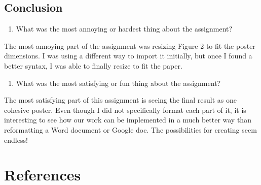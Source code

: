 \documentclass[
  man,floatsintext]{apa6}
\providecommand{\tightlist}{%
  \setlength{\itemsep}{0pt}\setlength{\parskip}{0pt}}
\begin{document}
\subsection{Conclusion}\label{conclusion}

\begin{enumerate}
\def\labelenumi{\arabic{enumi}.}
\tightlist
\item
  What was the most annoying or hardest thing about the assignment?
\end{enumerate}

The most annoying part of the assignment was resizing Figure 2 to fit the poster dimensions. I was using a different way to import it initially, but once I found a better syntax, I was able to finally resize to fit the paper.

\begin{enumerate}
\def\labelenumi{\arabic{enumi}.}
\setcounter{enumi}{1}
\tightlist
\item
  What was the most satisfying or fun thing about the assignment?
\end{enumerate}

The most satisfying part of this assignment is seeing the final result as one cohesive poster. Even though I did not specifically format each part of it, it is interesting to see how our work can be implemented in a much better way than reformatting a Word document or Google doc. The possibilities for creating seem endless!

\newpage

\section{References}\label{references}
\end{document}
